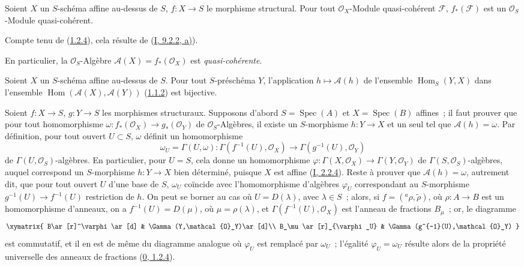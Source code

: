 \begin{proposition}[1.2.6]
\label{II.1.2.6-fr}
Soient $X$ un $S$-schéma affine au-dessus de $S$, $f:X\to S$ le morphisme
structural. Pour tout $\mathcal{O}_X$-Module quasi-cohérent $\mathcal{F}$,
$f_*(\mathcal{F})$ est un $\mathcal{O}_S$-Module quasi-cohérent.
\end{proposition}

Compte tenu de (\hyperref[II.1.2.4-fr]{1.2.4}), cela résulte de
(\hyperref[I.9.2.2-fr]{I, 9.2.2, a)}).

En particulier, la $\mathcal{O}_S$-Algèbre
$\mathcal{A}(X)=f_*(\mathcal{O}_X)$ est \emph{quasi-cohérente}.

\begin{proposition}[1.2.7]
\label{II.1.2.7-fr}
Soient $X$ un $S$-schéma affine au-dessus de $S$. Pour tout $S$-préschéma
$Y$, l'application $h\mapsto\mathcal{A}(h)$ de l'ensemble
$\operatorname{Hom}_S(Y,X)$ dans l'ensemble
$\operatorname{Hom}(\mathcal{A}(X),\mathcal{A}(Y))$
(\hyperref[II.1.1.2-fr]{1.1.2}) est bijective.
\end{proposition}

Soient $f:X\to S$, $g:Y\to S$ les morphismes structuraux. Supposons d'abord
$S=\operatorname{Spec}(A)$ et $X=\operatorname{Spec}(B)$ affines~; il faut
prouver que pour tout homomorphisme
$\omega:f_*(\mathcal{O}_X)\to g_*(\mathcal{O}_Y)$ de
$\mathcal{O}_S$-Algèbres, il existe un $S$-morphisme $h:Y\to X$ et un seul
tel que $\mathcal{A}(h)=\omega$. Par définition, pour tout ouvert $U\subset
S$, $\omega$ définit un homomorphisme
\[
  \omega_U=\Gamma(U,\omega):
  \Gamma(f^{-1}(U),\mathcal{O}_X)\to
  \Gamma(g^{-1}(U),\mathcal{O}_Y)
\]
de $\Gamma(U,\mathcal{O}_S)$-algèbres. En particulier, pour $U=S$, cela
donne un homomorphisme
$\varphi:\Gamma(X,\mathcal{O}_X)\to\Gamma(Y,\mathcal{O}_Y)$ de
$\Gamma(S,\mathcal{O}_S)$-algèbres, auquel correspond un $S$-morphisme
$h:Y\to X$ bien déterminé, puisque $X$ est affine
(\hyperref[I.2.2.4-fr]{I, 2.2.4}). Reste à prouver que
$\mathcal{A}(h)=\omega$, autrement dit, que pour tout ouvert $U$ d'une base
de $S$, $\omega_U$ coïncide avec l'homomorphisme d'algèbres $\varphi_U$
correspondant au $S$-morphisme $g^{-1}(U)\to f^{-1}(U)$ restriction de $h$.
On peut se borner au cas où $U=D(\lambda)$, avec $\lambda\in S$~; alors, si
$f=({}^a\rho,\widetilde{\rho})$, où $\rho:A\to B$ est un homomorphisme
d'anneaux, on a $f^{-1}(U)=D(\mu)$, où $\mu=\rho(\lambda)$, et
$\Gamma(f^{-1}(U),\mathcal{O}_X)$ est l'anneau de fractions $B_\mu$~; or,
le diagramme
\[
  \xymatrix{
    B\ar[r]^\varphi\ar[d] & \Gamma(Y,\mathcal{O}_Y)\ar[d]\\
    B_\mu\ar[r]_{\varphi_U} & \Gamma(g^{-1}(U),\mathcal{O}_Y)
  }
\]
est commutatif, et il en est de même du diagramme analogue où $\varphi_U$
est remplacé par $\omega_U$~; l'égalité $\varphi_U=\omega_U$ résulte alors
de la propriété universelle des anneaux de fractions
(\hyperref[0.1.2.4-fr]{0, 1.2.4}).

